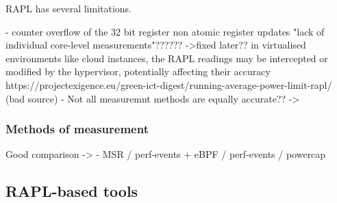 RAPL has several limitations. 

- counter overflow of the 32 bit register
non atomic register updates
"lack of individual core-level measurements"?????? ->fixed later??
in virtualised environments like cloud instances, the RAPL readings may be intercepted or modified by the hypervisor, potentially affecting their accuracy
    https://projectexigence.eu/green-ict-digest/running-average-power-limit-rapl/ (bad source)
- Not all measuremnt methods are equally accurate?? -> \parencite{raffin2024dissecting}

\subsubsection{Methods of measurement}
Good comparison -> \parencite{raffin2024dissecting}
- MSR / perf-events + eBPF / perf-events / powercap


\subsection{RAPL-based tools}